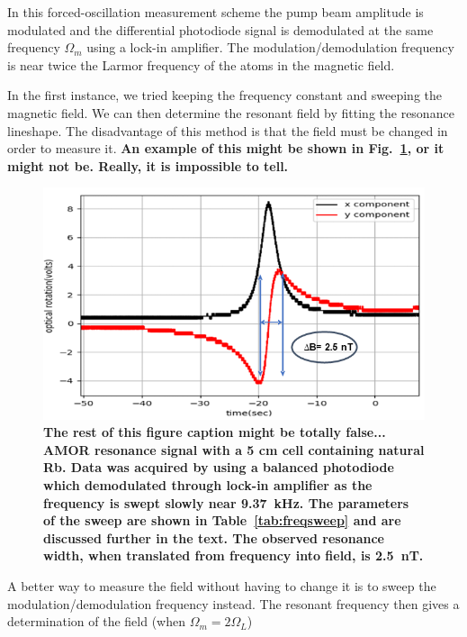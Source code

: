 In this forced-oscillation measurement scheme the pump beam amplitude
is modulated and the differential photodiode signal is demodulated at
the same frequency $\Omega_m$ using a lock-in amplifier.  The
modulation/demodulation frequency is near twice the Larmor frequency
of the atoms in the magnetic field.

In the first instance, we tried keeping the frequency constant and
sweeping the magnetic field.  We can then determine the resonant field
by fitting the resonance lineshape.  The disadvantage of this method
is that the field must be changed in order to measure it.  {\bf An
  example of this might be shown in Fig.~\ref{fig:AMORmaybeidontknow},
  or it might not be.  Really, it is impossible to tell.}

\begin{figure}[h]
\centering\includegraphics[width=0.7\linewidth]{figures/AM_NMOR}
\caption{\bf The rest of this figure caption might be totally
  false... AMOR resonance signal with a 5 cm cell containing natural
  Rb.  Data was acquired by using a balanced photodiode which
  demodulated through lock-in amplifier as the frequency is swept
  slowly near 9.37~kHz.  The parameters of the sweep are shown in
  Table~\ref{tab:freqsweep} and are discussed further in the text. The
  observed resonance width, when translated from frequency into field,
  is 2.5~nT.\label{fig:AMORmaybeidontknow}}
\end{figure} 

A better way to measure the field without having to change it is to
sweep the modulation/demodulation frequency instead.  The resonant
frequency then gives a determination of the field (when
$\Omega_m=2\Omega_L$)


